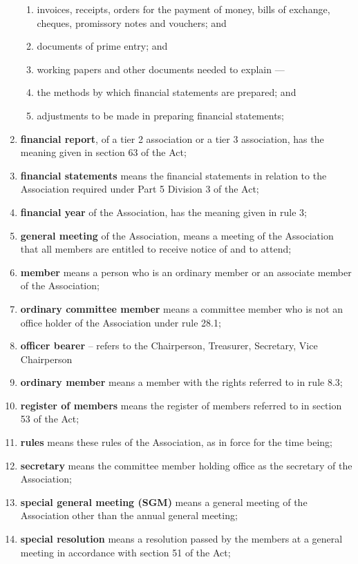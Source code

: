 \begin{enumerate}
\begin{enumerate}
  \item invoices, receipts, orders for the payment of money, bills of exchange, cheques, promissory notes and vouchers; and
  \item documents of prime entry; and
  \item working papers and other documents needed to explain ---
  \item the methods by which financial statements are prepared; and
  \item adjustments to be made in preparing financial statements;
  \end{enumerate}
\item \textbf{financial report}, of a tier 2 association or a tier 3 association, has the meaning given in section 63 of the Act;
\item \textbf{financial statements} means the financial statements in relation to the Association required under Part 5 Division 3 of the Act;
\item \textbf{financial year} of the Association, has the meaning given in rule 3;
\item \textbf{general meeting} of the Association, means a meeting of the Association that all members are entitled to receive notice of and to attend;
\item \textbf{member} means a person who is an ordinary member or an associate member of the Association;
\item \textbf{ordinary committee member} means a committee member who is not an office holder of the Association under rule 28.1;
\item \textbf{officer bearer} -- refers to the Chairperson, Treasurer, Secretary, Vice Chairperson
\item \textbf{ordinary member} means a member with the rights referred to in rule 8.3;
\item \textbf{register of members} means the register of members referred to in section 53 of the Act;
\item \textbf{rules} means these rules of the Association, as in force for the time being;
\item \textbf{secretary} means the committee member holding office as the secretary of the Association;
\item \textbf{special general meeting (SGM)} means a general meeting of the Association other than the annual general meeting;
\item \textbf{special resolution} means a resolution passed by the members at a general meeting in accordance with section 51 of the Act;

\end{enumerate}
